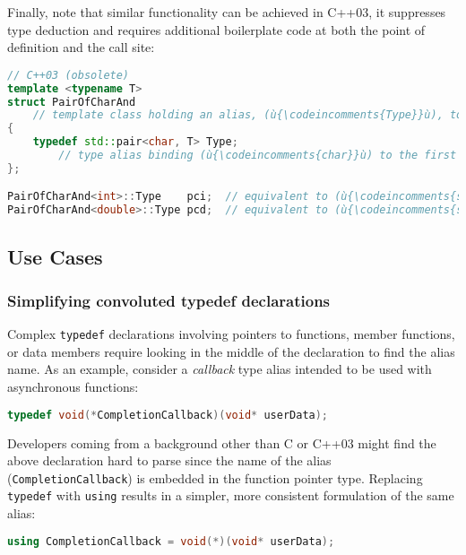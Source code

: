 \noindent Finally, note that similar functionality can be
achieved in C++03, it suppresses type deduction and requires additional boilerplate code at both the
point of definition and the call site:

\begin{lstlisting}[language=C++]
// C++03 (obsolete)
template <typename T>
struct PairOfCharAnd
    // template class holding an alias, (ù{\codeincomments{Type}}ù), to (ù{\codeincomments{std::pair<char, T>}}ù)
{
    typedef std::pair<char, T> Type;
        // type alias binding (ù{\codeincomments{char}}ù) to the first type parameter of (ù{\codeincomments{std::pair}}ù)
};

PairOfCharAnd<int>::Type    pci;  // equivalent to (ù{\codeincomments{std::pair<char, int> pci;}}ù)
PairOfCharAnd<double>::Type pcd;  // equivalent to (ù{\codeincomments{std::pair<char, double> pcd;}}ù)
\end{lstlisting}


\subsection[Use Cases]{Use Cases}\label{use-cases}

\subsubsection[Simplifying convoluted \lstinline!typedef! declarations]{Simplifying convoluted {\SubsubsecCode typedef} declarations}\label{simplifying-convoluted-typedef-declarations}

Complex \lstinline!typedef! declarations involving pointers to functions,
member functions, or data members require looking in the middle of the
declaration to find the alias name. As an example, consider a
\emph{callback} type alias intended to be used with asynchronous functions:

\begin{lstlisting}[language=C++]
typedef void(*CompletionCallback)(void* userData);
\end{lstlisting}

\noindent Developers coming from a background other than C or C++03 might find the
above declaration hard to parse since the name of the alias
(\lstinline!CompletionCallback!) is embedded in the function pointer type.
Replacing \lstinline!typedef! with \lstinline!using! results in a simpler,
more consistent formulation of the same alias:

\begin{lstlisting}[language=C++]
using CompletionCallback = void(*)(void* userData);
\end{lstlisting}

